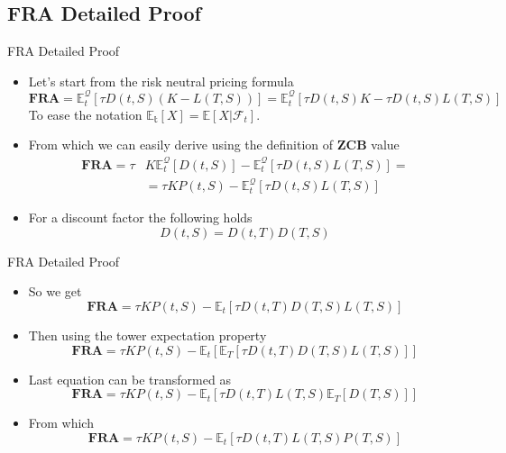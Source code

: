 \documentclass{beamer}
\begin{document}
\subsection{FRA Detailed Proof}
\begin{frame}{FRA Detailed Proof}
\begin{itemize}
	\item<1-> Let's start from the risk neutral pricing formula
	\begin{equation} \textbf{FRA} = 
\mathbb{E}^\mathcal{Q}_t[\tau D(t,S)(K - L(T,S))] = 	\mathbb{E}^\mathcal{Q}_t[\tau D(t,S)K - \tau D(t,S)L(T,S)]
	\label{eq:fra_as_expectation}
	\end{equation}
	To ease the notation $\mathbb{E_t}[X] = \mathbb{E}[X|\mathcal{F}_t]$.
	\item<2-> From which we can easily derive using the definition of \textbf{ZCB} value
	\begin{equation*}
		\begin{aligned}
		\textbf{FRA} = \tau &K\mathbb{E}_t^\mathcal{Q}[D(t,S)] - \mathbb{E}_t^\mathcal{Q}[\tau D(t,S)L(T,S)] = \\
		&=\tau KP(t,S) - \mathbb{E}_t^\mathcal{Q}[\tau D(t,S)L(T,S)]
		\end{aligned}
	\end{equation*}
	\item<3-> For a discount factor the following holds
	\begin{equation*}
		D(t,S) = D(t,T)D(T,S)
	\end{equation*}
\end{itemize}
\end{frame}

\begin{frame}{FRA Detailed Proof}
	\begin{itemize}
		\item<1-> So we get
		\begin{equation*}
			\textbf{FRA} = \tau KP(t,S)-\mathbb{E}_t[\tau D(t,T)D(T,S)L(T,S)]
		\end{equation*}
		\item<2-> Then using the tower expectation property
		\begin{equation*}
		\textbf{FRA} = \tau KP(t,S) - \mathbb{E}_t[\mathbb{E}_T[\tau D(t,T)D(T,S)L(T,S)]]
		\end{equation*}
		\item<3-> Last equation can be transformed as
		\begin{equation*}
			\textbf{FRA} = \tau KP(t,S) - \mathbb{E}_t[\tau D(t,T)L(T,S)\mathbb{E}_T[D(T,S)]]
		\end{equation*}
		\item<4-> From which
		\begin{equation*}
		\textbf{FRA} = \tau KP(t,S) - \mathbb{E}_t[\tau D(t,T)L(T,S)P(T,S)]
		\end{equation*}
	\end{itemize}
\end{frame}
\end{document}
